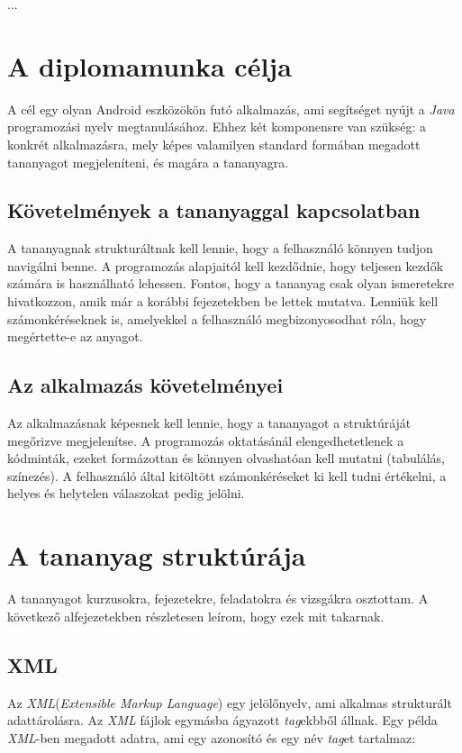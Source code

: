 \documentclass[12pt,a4paper]{article}
\newcommand{\xml}{\textit{XML}\xspace}
\begin{document}
	...

	\section{A diplomamunka célja}
	
	A cél egy olyan Android eszközökön futó alkalmazás, ami segítséget nyújt a \textit{Java} programozási nyelv megtanulásához. Ehhez két komponensre van szükség: a konkrét alkalmazásra, mely képes valamilyen standard formában megadott tananyagot megjeleníteni, és magára a tananyagra.

	\subsection{Követelmények a tananyaggal kapcsolatban}
	
	A tananyagnak strukturáltnak kell lennie, hogy a felhasználó könnyen tudjon navigálni benne. A programozás alapjaitól kell kezdődnie, hogy teljesen kezdők számára is használható lehessen. Fontos, hogy a tananyag csak olyan ismeretekre hivatkozzon, amik már a korábbi fejezetekben be lettek mutatva. Lenniük kell számonkéréseknek is, amelyekkel a felhasználó megbizonyosodhat róla, hogy megértette-e az anyagot. 

	\subsection{Az alkalmazás követelményei}
	
	Az alkalmazásnak képesnek kell lennie, hogy a tananyagot a struktúráját megőrizve megjelenítse. A programozás oktatásánál elengedhetetlenek a kódminták, ezeket formázottan és könnyen olvashatóan kell mutatni (tabulálás, színezés). A felhasználó által kitöltött számonkéréseket ki kell tudni értékelni, a helyes és helytelen válaszokat pedig jelölni.
	
	\section{A tananyag struktúrája}  
	
	A tananyagot kurzusokra, fejezetekre, feladatokra és vizsgákra osztottam. A következő alfejezetekben részletesen leírom, hogy ezek mit takarnak.
		
	\subsection{XML}
	
	Az \xml (\textit{Extensible Markup Language}) egy jelölőnyelv, ami alkalmas strukturált adattárolásra. Az \xml fájlok egymásba ágyazott \textit{tag}ekbből állnak. Egy példa \xml-ben megadott adatra, ami egy azonosító és egy név \textit{tag}et tartalmaz:
	
\end{document}
